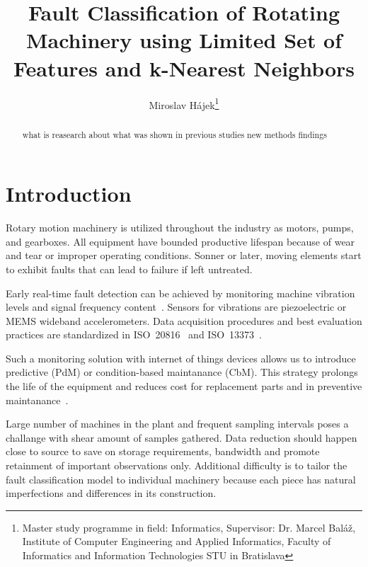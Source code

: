 \documentclass{llncs}
\begin{document}
\title{Fault Classification of Rotating Machinery using Limited Set of Features and k-Nearest Neighbors}

\author{
	Miroslav Hájek\thanks{Master study programme in field: Informatics,
	Supervisor: Dr. Marcel Baláž, Institute of Computer Engineering and Applied Informatics, Faculty of Informatics and Information Technologies STU in Bratislava}
}


\maketitle

\begin{abstract}
what is reasearch about
what was shown in previous studies
new methods
findings

\end{abstract}


\section{Introduction}
Rotary motion machinery is utilized throughout the industry as motors, pumps, and gearboxes. All equipment have bounded productive lifespan because of wear and tear or improper operating conditions. Sonner or later, moving elements start to exhibit faults that can lead to failure if left untreated. 

Early real-time fault detection can be achieved by monitoring machine vibration levels and signal frequency content~\cite{ziaran_technicka_2013}. Sensors for vibrations are piezoelectric or MEMS wideband accelerometers. Data acquisition procedures and best evaluation practices are standardized in ISO~20816~\cite{noauthor_iso_2016} and ISO~13373~\cite{noauthor_iso_2002}. 

Such a monitoring solution with internet of things devices allows us to introduce predictive (PdM) or condition-based maintanance (CbM). This strategy prolongs the life of the equipment and reduces cost for replacement parts and in preventive maintanance~\cite{ziaran_technicka_2013}. 

Large number of machines in the plant and frequent sampling intervals poses a challange with shear amount of samples gathered. Data reduction should happen close to source to save on storage requirements, bandwidth and promote retainment of important observations only. Additional difficulty is to tailor the fault classification model to individual machinery because each piece has natural imperfections and differences in its construction. 
\end{document}
